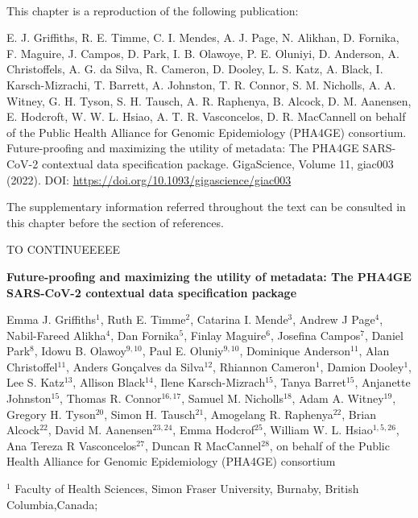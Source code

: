 \mbox{}\\
\vspace{8cm}

This chapter is a reproduction of the following publication:

E. J. Griffiths, R. E. Timme, C. I. Mendes, A. J. Page, N. Alikhan, D. Fornika, F. Maguire, J. Campos, D. Park, I. B. Olawoye, P. E. Oluniyi, D. Anderson, A. Christoffels, A. G. da Silva, R. Cameron, D. Dooley, L. S. Katz, A. Black, I. Karsch-Mizrachi, T. Barrett, A. Johnston, T. R. Connor, S. M. Nicholls, A. A. Witney, G. H. Tyson, S. H. Tausch, A. R. Raphenya, B. Alcock, D. M. Aanensen, E. Hodcroft, W. W. L. Hsiao, A. T. R. Vasconcelos, D. R. MacCannell on behalf of the Public Health Alliance for Genomic Epidemiology (PHA4GE) consortium.
Future-proofing and maximizing the utility of metadata: The PHA4GE SARS-CoV-2 contextual data specification package. GigaScience, Volume 11, giac003 (2022). DOI: \url{https://doi.org/10.1093/gigascience/giac003}

The supplementary information referred throughout the text can be consulted in this chapter before the section of references. 

TO CONTINUEEEEE

\cleardoublepage 

\begin{center}
\large
\textbf{Future-proofing and maximizing the utility of metadata: The PHA4GE SARS-CoV-2 contextual data specification package}
\end{center}

Emma J. Griffiths$^1$, 
Ruth E. Timme$^2$,
Catarina I. Mende$^3$,
Andrew J Page$^4$,
Nabil-Fareed Alikha$^4$,
Dan Fornika$^5$,
Finlay Maguire$^6$,
Josefina Campos$^7$,
Daniel Park$^8$,
Idowu B. Olawoy$^{9,10}$,
Paul E. Oluniy$^{9,10}$,
Dominique Anderson$^{11}$,
Alan Christoffel$^{11}$,
Anders Gonçalves da Silva$^{12}$,
Rhiannon Cameron$^1$,
Damion Dooley$^1$,
Lee S. Katz$^{13}$,
Allison Black$^{14}$,
Ilene Karsch-Mizrach$^{15}$,
Tanya Barret$^{15}$,
Anjanette Johnston$^{15}$,
Thomas R. Connor$^{16,17}$,
Samuel M. Nicholls$^{18}$,
Adam A. Witney$^{19}$,
Gregory H. Tyson$^{20}$,
Simon H. Tausch$^{21}$,
Amogelang R. Raphenya$^{22}$,
Brian Alcock$^{22}$,
David M. Aanensen$^{23,24}$,
Emma Hodcrof$^{25}$,
William W. L. Hsiao$^{1,5,26}$,
Ana Tereza R Vasconcelos$^{27}$,
Duncan R MacCannel$^{28}$,
on behalf of the Public Health Alliance for Genomic Epidemiology (PHA4GE) consortium

$^1$  Faculty of Health Sciences, Simon Fraser University, Burnaby, British Columbia,Canada;

